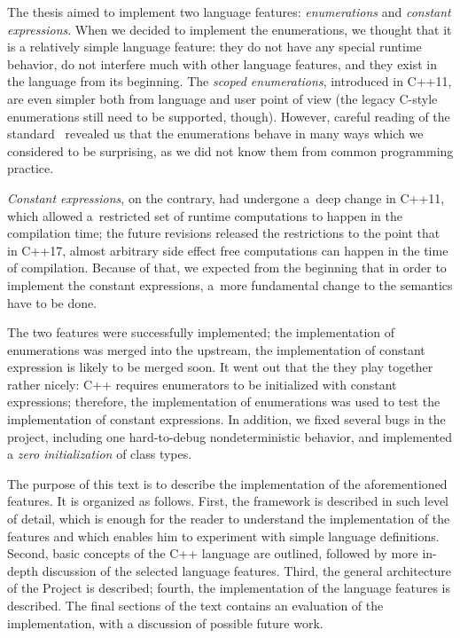 \documentclass{fithesis3}
\newcommand{\Project}{Project\xspace}
\begin{document}
The thesis aimed to implement two language features: \textit{enumerations} and \textit{constant expressions}. When we decided to implement the enumerations, we thought that it is a relatively simple language feature: they do not have any special runtime behavior, do not interfere much with other language features, and they exist in the language from its beginning. The \textit{scoped enumerations}, introduced in C++11, are even simpler both from language and user point of view (the legacy C-style enumerations still need to be supported, though). However, careful reading of the standard~\cite{n4296} revealed us that the enumerations behave in many ways which we considered to be surprising, as we did not know them from common programming practice.

\textit{Constant expressions}, on the contrary, had undergone a~deep change in C++11, which allowed a~restricted set of runtime computations to happen in the compilation time; the future revisions released the restrictions to the point that in C++17, almost arbitrary side effect free computations can happen in the time of compilation. Because of that, we expected from the beginning that in order to implement the constant expressions, a~more fundamental change to the semantics have to be done.

The two features were successfully implemented; the implementation of enumerations was merged into the upstream, the implementation of constant expression is likely to be merged soon. It went out that the they play together rather nicely: C++ requires enumerators to be initialized with constant expressions; therefore, the implementation of enumerations was used to test the implementation of constant expressions.  In addition, we fixed several bugs in the project, including one hard-to-debug nondeterministic behavior, and implemented a \textit{zero initialization} of class types.

 

The purpose of this text is to describe the implementation of the aforementioned features. It is organized as follows. First, the \K framework is described in such level of detail, which is enough for the reader to understand the implementation of the features and which enables him to experiment with simple language definitions. Second, basic concepts of the C++ language are outlined, followed by more in-depth discussion of the selected language features. Third, the general architecture of the \Project is described; fourth, the implementation of the language features is described. The final sections of the text contains an evaluation of the implementation, with a discussion of possible future work.
\end{document}
